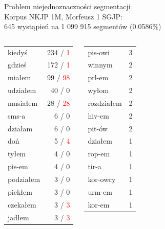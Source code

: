 \documentclass[xcolor=dvipsnames,polish]{beamer}
\newcommand{\markerr}[1]{\textcolor{red}{#1}}
\begin{document}
\begin{frame}{Problem niejednoznaczności segmentacji}
  \\
  Korpus NKJP 1M, Morfeusz 1 SGJP:\\
  645 wystąpień na 1 099 915 segmentów (0.0586\%)
  \begin{columns}[c]
    \begin{center}
      \footnotesize
      \begin{tabular}{l|r}
      kiedyś & 234 / \markerr{1} \\
      gdzieś & 172 / \markerr{1} \\
      miałem & 99 / \markerr{98} \\
      udziałem & 40 / 0 \\
      musiałem & 28 / \markerr{28} \\
      sms-a & 6 / 0 \\
      działam & 6 / 0\\
      doń & 5 / \markerr{4} \\
      tyłem & 4 / 0 \\
      pis-em & 4 / 0 \\
      podziałem & 3 / 0 \\
      piekłem & 3 / 0 \\
      czekałem & 3 / \markerr{3} \\
      jadłem & 3 / \markerr{3} \\
      \end{tabular}
    \end{center}
    \begin{center}
      \footnotesize
      \begin{tabular}{l|r}
        pis-owi & 3 \\
        winnym & 2 \\
        prl-em & 2 \\
        wyłom & 2 \\
        rozdziałem & 2 \\
        hiv-em & 2 \\
        pit-ów & 2 \\
        działem & 1 \\
        rop-em & 1 \\
        tir-a & 1 \\
        kor-owcy & 1 \\
        urm-em & 1 \\
        kor-em & 1 \\

\end{tabular}
\end{center}
\end{columns}
\end{frame}
\end{document}
